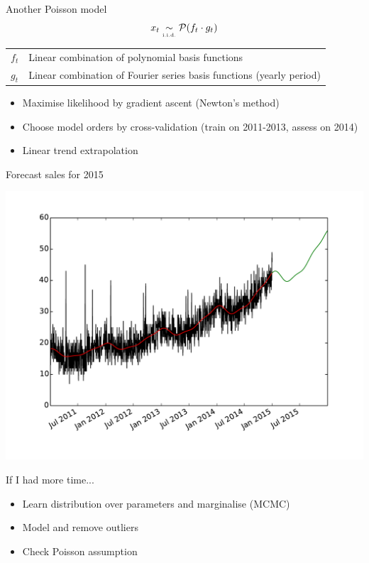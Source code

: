 \documentclass{beamer}
\begin{document}
\begin{frame}{Another Poisson model}
 \begin{equation}
  x_{t} \underset{\text{\tiny i.i.d.}}{\sim} \mathcal{P}(f_t \cdot g_t)
 \end{equation}
 
 \begin{tabular}{ll}
  $f_t$ & Linear combination of polynomial basis functions \\
  $g_t$ & Linear combination of Fourier series basis functions (yearly period)
 \end{tabular}
 
 \begin{itemize}
  \item Maximise likelihood by gradient ascent (Newton's method)
  \item Choose model orders by cross-validation (train on 2011-2013, assess on 2014)
  \item Linear trend extrapolation
 \end{itemize}
\end{frame}

\begin{frame}{Forecast sales for 2015}
 \begin{center}
  \includegraphics[width=0.8\columnwidth]{modelled.pdf}
 \end{center}
\end{frame}

\begin{frame}{If I had more time...}
 \begin{itemize}
  \item Learn distribution over parameters and marginalise (MCMC)
  \item Model and remove outliers
  \item Check Poisson assumption
 \end{itemize}
\end{frame}

\begin{frame}
\end{frame}
\end{document}
